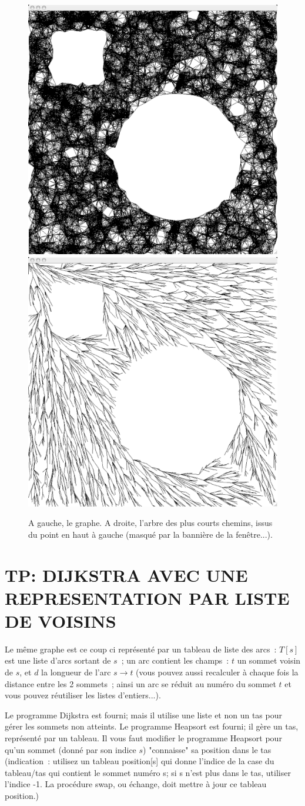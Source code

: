 \documentclass[a4paper]{article}
\begin{document}
{\begin{figure}
\begin{center}
\includegraphics[width=0.45\linewidth]{graphe_PCC.eps}
\includegraphics[width=0.45\linewidth]{arbre_PCC.eps}
\end{center}
\caption{A gauche, le graphe. A droite, l'arbre des plus courts chemins, issus du point en haut \`a gauche (masqu\'e par la banni\`ere de la fen\^etre...). }
\end{figure}

\section{TP: DIJKSTRA AVEC UNE REPRESENTATION PAR LISTE DE VOISINS}
Le m\^eme graphe est ce coup ci repr\'esent\'e par un tableau de liste des arcs~:
$T[s]$ est une liste d'arcs sortant de $s$~; un arc contient les champs~: $t$ un sommet voisin de $s$, et 
$d$ la longueur de l'arc $s\rightarrow t$ (vous pouvez aussi recalculer \`a chaque fois la distance entre les 2 sommets~; ainsi un arc se r\'eduit au num\'ero du sommet $t$ et vous pouvez r\'eutiliser les listes d'entiers...).

Le programme Dijkstra est fourni; mais il utilise une liste et non un tas pour g\'erer les sommets non atteints.
Le programme Heapsort est fourni; il g\`ere un tas, repr\'esent\'e par un tableau. 
Il vous faut modifier le programme
Heapsort pour qu'un sommet (donn\'e par son indice $s$) "connaisse" sa position dans le tas (indication~: utilisez un tableau position[s] qui donne l'indice de la case du tableau/tas qui contient
le sommet num\'ero s; si s n'est plus dans le tas, utiliser l'indice -1. La proc\'edure swap, ou \'echange, doit mettre \`a jour ce tableau position.)
}
\end{document}
